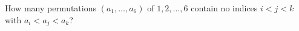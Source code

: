 How many permutations $(a_1,\ldots,a_6)$ of $1,2,\ldots,6$ contain no indices $i<j<k$ with $a_i<a_j<a_k$?
